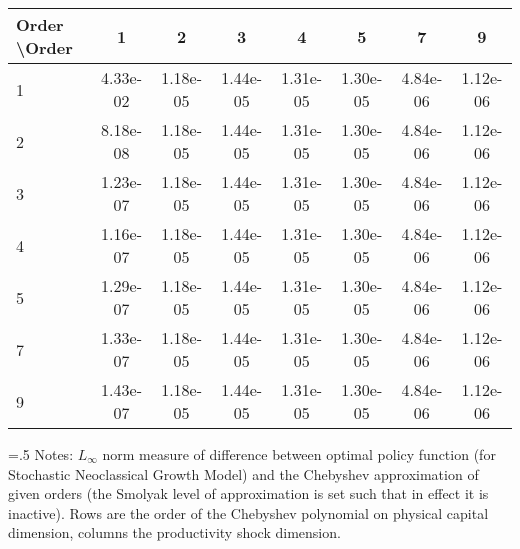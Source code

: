 \begin{tabular*}{1.00\textwidth}{@{\extracolsep{\fill}}l|ccccccc} 
 \hline \hline 
 Order \textbackslash Order & 1 & 2 & 3 & 4 & 5 & 7 & 9 \\ 
 \hline 
1 & 4.33e-02 & 1.18e-05 & 1.44e-05 & 1.31e-05 & 1.30e-05 & 4.84e-06 & 1.12e-06 \\ 
 2 & 8.18e-08 & 1.18e-05 & 1.44e-05 & 1.31e-05 & 1.30e-05 & 4.84e-06 & 1.12e-06 \\ 
 3 & 1.23e-07 & 1.18e-05 & 1.44e-05 & 1.31e-05 & 1.30e-05 & 4.84e-06 & 1.12e-06 \\ 
 4 & 1.16e-07 & 1.18e-05 & 1.44e-05 & 1.31e-05 & 1.30e-05 & 4.84e-06 & 1.12e-06 \\ 
 5 & 1.29e-07 & 1.18e-05 & 1.44e-05 & 1.31e-05 & 1.30e-05 & 4.84e-06 & 1.12e-06 \\ 
 7 & 1.33e-07 & 1.18e-05 & 1.44e-05 & 1.31e-05 & 1.30e-05 & 4.84e-06 & 1.12e-06 \\ 
 9 & 1.43e-07 & 1.18e-05 & 1.44e-05 & 1.31e-05 & 1.30e-05 & 4.84e-06 & 1.12e-06 \\ 
 \hline 
 \end{tabular*} 
\begin{minipage}[t]{1.00\textwidth}{\baselineskip=.5\baselineskip \vspace{.3cm} \footnotesize{ 
Notes: $L_{\infty}$ norm measure of difference between optimal policy function (for Stochastic Neoclassical Growth Model) and the Chebyshev approximation of given orders (the Smolyak level of approximation is set such that in effect it is inactive). Rows are the order of the Chebyshev polynomial on physical capital dimension, columns the productivity shock dimension. \\ 
}} \end{minipage}